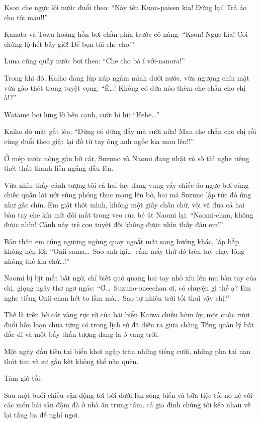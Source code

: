 \documentclass[../main.tex]{subfiles}
\begin{document}
Kson che ngực lội nước đuổi theo: ``Này tên Kuon-paisen kia! Đứng lại! Trả áo cho tôi mau!!''

Kanata và Towa hoảng hồn bơi chắn phía trước cô nàng: ``Kson! Ngực kìa! Coi chừng lộ hết bây giờ! Để bọn tôi che cho!''

Luna cũng quẫy nước bơi theo: ``Che cho bà í với-nanora!''

Trong khi đó, Kaiho đang lúp xúp ngâm mình dưới nước, vừa ngượng chín mặt vừa gào thét trong tuyệt vọng: ``Ê\dots! Không có đứa nào thèm che chắn cho chị à!?''

Watame bơi lững lờ bên cạnh, cười hí hí: ``Hehe\dots''

Kaiho đỏ mặt gắt lên: ``Đừng có đứng đấy mà cười nữa! Mau che chắn cho chị rồi cùng đuổi theo giật lại đồ từ tay ông anh ngốc kia mau lên!!''

Ở mép nước nông gần bờ cát, Suzuno và Naomi đang nhặt vỏ sò thì nghe tiếng thét thất thanh liền ngẩng đầu lên.

Vừa nhìn thấy cảnh tượng tôi cả hai tay đang vung vẩy chiếc áo ngực bơi cùng chiếc quần lót ướt sũng phóng thục mạng lên bờ, hai má Suzuno lập tức đỏ ửng như gấc chín. Em giật thót mình, không một giây chần chừ, vội vã đưa cả hai bàn tay che kín mít đôi mắt trong veo của bé út Naomi lại: ``Naomi-chan, không được nhìn! Cảnh này trẻ con tuyệt đối không được nhìn thấy đâu em!''

Bản thân em cũng ngượng ngùng quay ngoắt mặt sang hướng khác, lắp bắp không nên lời: ``Onii-sama\dots\ Sao anh lại\dots\ cầm mấy thứ đó trên tay chạy lông nhông thế kia chứ\dots!''

Naomi bị bịt mắt bất ngờ, chỉ biết quờ quạng hai tay nhỏ xíu lên mu bàn tay của chị, giọng ngây thơ ngơ ngác: ``Ơ\dots\ Suzuno-oneechan ơi, có chuyện gì thế ạ? Em nghe tiếng Onii-chan hét to lắm mà\dots\ Sao tự nhiên trời tối thui vậy chị?''

Thế là trên bờ cát vàng rực rỡ của bãi biển Kaiwa chiều hôm ấy, một cuộc rượt đuổi hỗn loạn chưa từng có trong lịch sử đã diễn ra giữa chàng Tổng quản lý bất đắc dĩ và một bầy thần tượng đang la ó vang trời.

Một ngày đầu tiên tại biển khơi ngập tràn những tiếng cười, những pha tai nạn thót tim và sự gắn kết không thể nào quên.

\ct

Tám giờ tối.

Sau một buổi chiều vận động tơi bời dưới làn sóng biển và bữa tiệc tối no nê với các món hải sản đậm đà ở nhà ăn trung tâm, cả gia đình chúng tôi kéo nhau về lại tầng ba để nghỉ ngơi.
\end{document}
